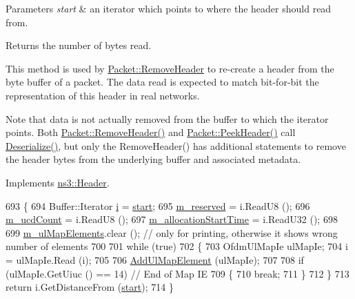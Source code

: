 \begin{DoxyParams}{Parameters}
{\em start} & an iterator which points to where the header should read from. \\
\hline
\end{DoxyParams}
\begin{DoxyReturn}{Returns}
the number of bytes read.
\end{DoxyReturn}
This method is used by \hyperlink{classns3_1_1Packet_a0961eccf975d75f902d40956c93ba63e}{Packet\+::\+Remove\+Header} to re-\/create a header from the byte buffer of a packet. The data read is expected to match bit-\/for-\/bit the representation of this header in real networks.

Note that data is not actually removed from the buffer to which the iterator points. Both \hyperlink{classns3_1_1Packet_a0961eccf975d75f902d40956c93ba63e}{Packet\+::\+Remove\+Header()} and \hyperlink{classns3_1_1Packet_aadc63487bea70945c418f4c3e9b81964}{Packet\+::\+Peek\+Header()} call \hyperlink{classns3_1_1UlMap_a9bb02bf675c74186e4d0918954adfea4}{Deserialize()}, but only the Remove\+Header() has additional statements to remove the header bytes from the underlying buffer and associated metadata. 

Implements \hyperlink{classns3_1_1Header_a78be9400bb66b2a8543606f395ef5396}{ns3\+::\+Header}.


\begin{DoxyCode}
693 \{
694   Buffer::Iterator \hyperlink{bernuolliDistribution_8m_a6f6ccfcf58b31cb6412107d9d5281426}{i} = \hyperlink{namespacevisualizer_1_1core_a2a35e5d8a34af358b508dac8635754e0}{start};
695   \hyperlink{classns3_1_1UlMap_a5ac6702cabf1acf23fb0556f7d0221fd}{m\_reserved} = i.ReadU8 ();
696   \hyperlink{classns3_1_1UlMap_a3bb89d3859c1574887aa8df71630e832}{m\_ucdCount} = i.ReadU8 ();
697   \hyperlink{classns3_1_1UlMap_ac5e046fb55c4533f264477645758d089}{m\_allocationStartTime} = i.ReadU32 ();
698 
699   \hyperlink{classns3_1_1UlMap_ad3c135ad9afb96b612ec44d6b47c54de}{m\_ulMapElements}.clear (); \textcolor{comment}{// only for printing, otherwise it shows wrong number of
       elements}
700 
701   \textcolor{keywordflow}{while} (\textcolor{keyword}{true})
702     \{
703       OfdmUlMapIe ulMapIe;
704       i = ulMapIe.Read (i);
705 
706       \hyperlink{classns3_1_1UlMap_a60637b23f7686167de08d43422abcad0}{AddUlMapElement} (ulMapIe);
707 
708       \textcolor{keywordflow}{if} (ulMapIe.GetUiuc () == 14) \textcolor{comment}{// End of Map IE}
709         \{
710           \textcolor{keywordflow}{break};
711         \}
712     \}
713   \textcolor{keywordflow}{return} i.GetDistanceFrom (\hyperlink{namespacevisualizer_1_1core_a2a35e5d8a34af358b508dac8635754e0}{start});
714 \}
\end{DoxyCode}



